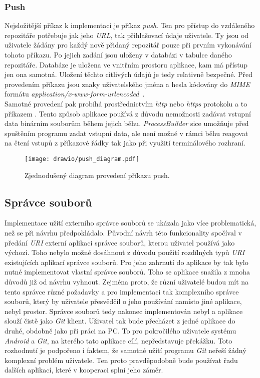         \subsubsection{Push}
        Nejsložitější příkaz k implementaci je příkaz \emph{push}. Ten pro přístup do vzdáleného repozitáře potřebuje jak jeho \emph{URL}, tak přihlašovací údaje uživatele. Ty jsou od uživatele žádány pro každý nově přidaný repozitář pouze při prvním vykonávání tohoto příkazu. Po jejich zadání jsou uloženy v databázi v tabulce daného repozitáře. Databáze je uložena ve vnitřním prostoru aplikace, kam má přístup jen ona samotná. Uložení těchto citlivých údajů je tedy relativně bezpečné. Před provedením příkazu jsou znaky uživatelského jména a hesla kódovány do \emph{MIME} formátu \emph{application/x-www-form-urlencoded}~.\\ Samotné provedení pak probíhá prostřednictvím \emph{http} nebo \emph{https} protokolu a to příkazem .
        Tento způsob aplikace používá z důvodu nemožnosti zadávat vstupní data binárním souborům během jejich běhu. \emph{ProcessBuilder} sice umožňuje před spuštěním programu zadat vstupní data, ale není možné v rámci běhu reagovat na čtení vstupů z příkazové řádky tak jako při využití terminálového rozhraní.

        \newpage
        \begin{figure}[h]
            \centering
            \vspace{0.5cm}
            \texttt{[image: drawio/push\_diagram.pdf]}
            \caption[Diagram provedení příkazu push]{Zjednodušený diagram provedení příkazu push.}
            \label{diagram:push}
        \end{figure}
    
    \subsection{Správce souborů}
    Implementace užití externího správce souborů se ukázala jako více problematická, než se při návrhu předpokládalo. Původní návrh této funkcionality spočíval v předání \emph{URI} externí aplikaci správce souborů, kterou uživatel používá jako výchozí. Toho nebylo možné dosáhnout z důvodu použití rozdílných typů \emph{URI} existujících aplikací správce souborů. Pro jeho zahrnutí do aplikace by tak bylo nutné implementovat vlastní správce souborů. Toho se aplikace snažila z mnoha důvodů již od návrhu vyhnout. Zejména proto, že různí uživatelé budou mít na tento správce různé požadavky a pro implementaci tak komplexního správce souborů, který by uživatele přesvědčil o jeho používání namísto jiné aplikace, nebyl prostor. Správce souborů tedy nakonec implementován nebyl a aplikace slouží čistě jako \emph{Git} klient. Uživatel tak bude přecházet z jedné aplikace do druhé, obdobně jako při práci na PC. To pro pokročilého uživatele systému \emph{Android} a \emph{Git}, na kterého tato aplikace cílí, nepředstavuje překážku.
    Toto rozhodnutí je podpořeno i faktem, že samotné užití programu \emph{Git} neřeší žádný komplexní problém uživatele. Ten proto pravděpodobně bude používat řadu dalších aplikací, které v kooperaci splní jeho záměr.

